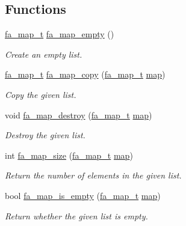 \subsection*{Functions}
\begin{DoxyCompactItemize}
\item 
\hyperlink{group___fa_map_gadcbb0c425af31be6aeb265159b2a7db0}{fa\-\_\-map\-\_\-t} \hyperlink{group___fa_map_gab96a62b8c3900af432faa9c7fe9a06e6}{fa\-\_\-map\-\_\-empty} ()
\begin{DoxyCompactList}\small\item\em Create an empty list. \end{DoxyCompactList}\item 
\hyperlink{group___fa_map_gadcbb0c425af31be6aeb265159b2a7db0}{fa\-\_\-map\-\_\-t} \hyperlink{group___fa_map_ga6431b8636b6f9de2db5eabc130607ddf}{fa\-\_\-map\-\_\-copy} (\hyperlink{group___fa_map_gadcbb0c425af31be6aeb265159b2a7db0}{fa\-\_\-map\-\_\-t} \hyperlink{literals_8h_a44305f0bc81207be0dcc90650733e331}{map})
\begin{DoxyCompactList}\small\item\em Copy the given list. \end{DoxyCompactList}\item 
void \hyperlink{group___fa_map_gaecb6f294fd3614f34c7308ebd8a2e25a}{fa\-\_\-map\-\_\-destroy} (\hyperlink{group___fa_map_gadcbb0c425af31be6aeb265159b2a7db0}{fa\-\_\-map\-\_\-t} \hyperlink{literals_8h_a44305f0bc81207be0dcc90650733e331}{map})
\begin{DoxyCompactList}\small\item\em Destroy the given list. \end{DoxyCompactList}\item 
int \hyperlink{group___fa_map_ga2b48664b3fd7e1c080c4c5f8071427f0}{fa\-\_\-map\-\_\-size} (\hyperlink{group___fa_map_gadcbb0c425af31be6aeb265159b2a7db0}{fa\-\_\-map\-\_\-t} \hyperlink{literals_8h_a44305f0bc81207be0dcc90650733e331}{map})
\begin{DoxyCompactList}\small\item\em Return the number of elements in the given list. \end{DoxyCompactList}\item 
bool \hyperlink{group___fa_map_gae580cafd90c4447a7970096d5dff8f46}{fa\-\_\-map\-\_\-is\-\_\-empty} (\hyperlink{group___fa_map_gadcbb0c425af31be6aeb265159b2a7db0}{fa\-\_\-map\-\_\-t} \hyperlink{literals_8h_a44305f0bc81207be0dcc90650733e331}{map})
\begin{DoxyCompactList}\small\item\em Return whether the given list is empty. \end{DoxyCompactList}\item 

\end{DoxyCompactItemize}
